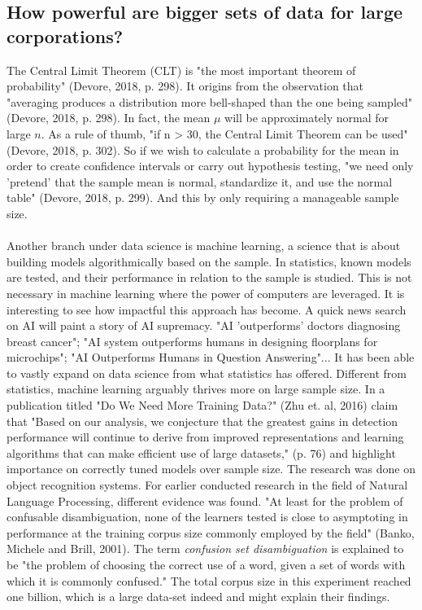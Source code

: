 \documentclass[11pt]{article}
\begin{document}
\subsection{How powerful are bigger sets of data for large corporations?}
The Central Limit Theorem (CLT) is "the most important theorem of probability" (Devore, 2018, p. 298). It origins from the observation that "averaging produces a distribution more bell-shaped than the one being sampled" (Devore, 2018, p. 298). In fact, the mean $\mu$ will be approximately normal for large $n$. As a rule of thumb, "if n > 30, the Central Limit Theorem can be used" (Devore, 2018, p. 302). So if we wish to calculate a probability for the mean in order to create confidence intervals or carry out hypothesis testing, "we need only 'pretend' that the sample mean is normal, standardize it, and use the normal table" (Devore, 2018, p. 299). And this by only requiring a manageable sample size.
\\ \\
Another branch under data science is machine learning, a science that is about building models algorithmically based on the sample. In statistics, known models are tested, and their performance in relation to the sample is studied. This is not necessary in machine learning where the power of computers are leveraged. It is interesting to see how impactful this approach has become. A quick news search on AI will paint a story of AI supremacy. "AI 'outperforms' doctors diagnosing breast cancer"; "AI system outperforms humans in designing floorplans for microchips"; "AI Outperforms Humans in Question Answering"... It has been able to vastly expand on data science from what statistics has offered. Different from statistics, machine learning arguably thrives more on large sample size. In a publication titled "Do We Need More Training Data?" (Zhu et. al, 2016) claim that "Based on our analysis, we conjecture that the greatest gains in detection performance will continue to derive from improved representations and learning algorithms that can make efficient use of large datasets," (p. 76) and highlight importance on correctly tuned models over sample size. The research was done on object recognition systems. For earlier conducted research in the field of Natural Language Processing, different evidence was found. "At least for the problem of confusable disambiguation, none of the learners tested is close to asymptoting in performance at the training corpus size commonly employed by the field" (Banko, Michele and Brill, 2001). The term \textit{confusion set disambiguation} is explained to be "the problem of choosing the correct use of a word, given a set of words with which it is commonly confused." The total corpus size in this experiment reached one billion, which is a large data-set indeed and might explain their findings.
\\
\end{document}

